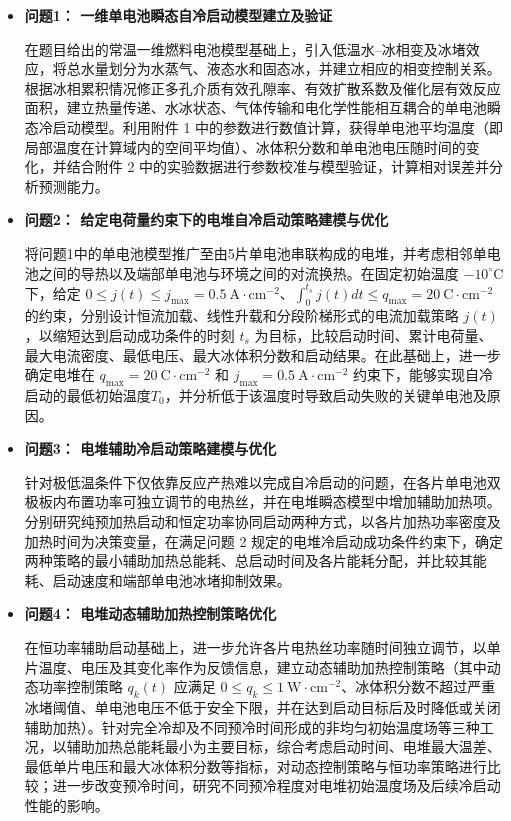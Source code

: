 \documentclass[bwprint]{gmcmthesis}
\numberwithin{equation}{section}
\numberwithin{figure}{section}
\begin{document}
\begin{itemize}
\renewcommand{\labelitemi}{$\blacktriangleright$}
\item \textbf {问题1： 一维单电池瞬态自冷启动模型建立及验证}

在题目给出的常温一维燃料电池模型基础上，引入低温水–冰相变及冰堵效应，将总水量划分为水蒸气、液态水和固态冰，并建立相应的相变控制关系。根据冰相累积情况修正多孔介质有效孔隙率、有效扩散系数及催化层有效反应面积，建立热量传递、水冰状态、气体传输和电化学性能相互耦合的单电池瞬态冷启动模型。利用附件 1 中的参数进行数值计算，获得单电池平均温度（即局部温度在计算域内的空间平均值）、冰体积分数和单电池电压随时间的变化，并结合附件 2 中的实验数据进行参数校准与模型验证，计算相对误差并分析预测能力。
\item \textbf {问题2： 给定电荷量约束下的电堆自冷启动策略建模与优化}

将问题1中的单电池模型推广至由5片单电池串联构成的电堆，并考虑相邻单电池之间的导热以及端部单电池与环境之间的对流换热。在固定初始温度 $-10^\circ\mathrm{C}$ 下，给定 $0 \leq j(t) \leq j_{\max} = 0.5 \ \mathrm{A}\cdot\mathrm{cm}^{-2}$、$\int_0^{t_s} j(t) dt \leq q_{\max} = 20 \ \mathrm{C}\cdot\mathrm{cm}^{-2}$ 的约束，分别设计恒流加载、线性升载和分段阶梯形式的电流加载策略 $j(t)$，以缩短达到启动成功条件的时刻 $t_s$ 为目标，比较启动时间、累计电荷量、最大电流密度、最低电压、最大冰体积分数和启动结果。在此基础上，进一步确定电堆在 $q_{\max} = 20\ \mathrm{C}\cdot\mathrm{cm}^{-2}$ 和 $j_{\max} = 0.5\ \mathrm{A}\cdot\mathrm{cm}^{-2}$ 约束下，能够实现自冷启动的最低初始温度$T_0$，并分析低于该温度时导致启动失败的关键单电池及原因。


\item \textbf {问题3： 电堆辅助冷启动策略建模与优化}

针对极低温条件下仅依靠反应产热难以完成自冷启动的问题，在各片单电池双极板内布置功率可独立调节的电热丝，并在电堆瞬态模型中增加辅助加热项。分别研究纯预加热启动和恒定功率协同启动两种方式，以各片加热功率密度及加热时间为决策变量，在满足问题 2 规定的电堆冷启动成功条件约束下，确定两种策略的最小辅助加热总能耗、总启动时间及各片能耗分配，并比较其能耗、启动速度和端部单电池冰堵抑制效果。
\item \textbf {问题4： 电堆动态辅助加热控制策略优化}

在恒功率辅助启动基础上，进一步允许各片电热丝功率随时间独立调节，以单片温度、电压及其变化率作为反馈信息，建立动态辅助加热控制策略（其中动态功率控制策略 $q_k(t)$ 应满足 $0 \leq q_k \leq 1 \ \mathrm{W} \cdot \mathrm{cm}^{-2}$、冰体积分数不超过严重冰堵阈值、单电池电压不低于安全下限，并在达到启动目标后及时降低或关闭辅助加热）。针对完全冷却及不同预冷时间形成的非均匀初始温度场等三种工况，以辅助加热总能耗最小为主要目标，综合考虑启动时间、电堆最大温差、最低单片电压和最大冰体积分数等指标，对动态控制策略与恒功率策略进行比较；进一步改变预冷时间，研究不同预冷程度对电堆初始温度场及后续冷启动性能的影响。
\end{itemize}
\end{document}
